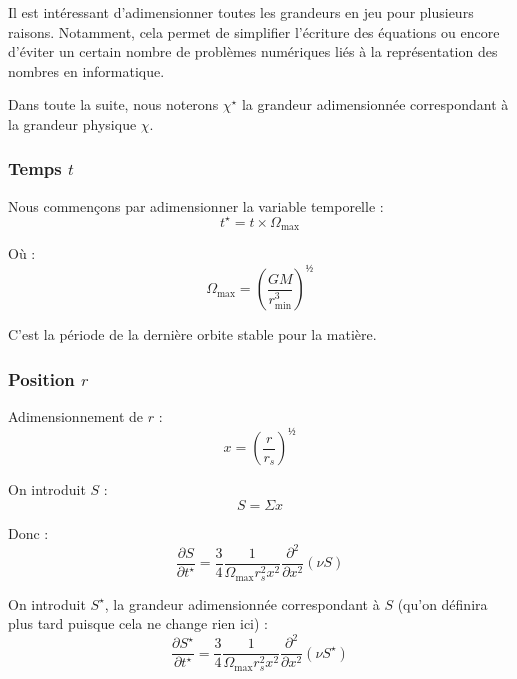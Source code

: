 Il est intéressant d’adimensionner toutes les grandeurs en jeu pour plusieurs
raisons. Notamment, cela permet de simplifier l’écriture des équations ou
encore d’éviter un certain nombre de problèmes numériques liés à la
représentation des nombres en informatique.

Dans toute la suite, nous noterons $\chi^\star$ la grandeur adimensionnée
correspondant à la grandeur physique $\chi$.

\subsubsection{\texorpdfstring{Temps $t$}{Temps t}}

Nous commençons par adimensionner la variable temporelle :
\begin{equation}
    t^\star = t \times \Omega_\mathrm{max}
\end{equation}

Où :
\begin{equation}
    \Omega_\mathrm{max} = \left( \frac{G M}{r^3_\mathrm{min}} \right)^½
\end{equation}

C’est la période de la dernière orbite stable pour la matière.

\subsubsection{\texorpdfstring{Position $r$}{Position r}}

Adimensionnement de $r$ :
\begin{equation}
    x = \left( \frac{r}{r_s} \right)^½
\end{equation}

On introduit $S$ :
\begin{equation}
    S = \Sigma x
\end{equation}

Donc :
\begin{equation}
    \frac{\partial S}{\partial t^\star} = \frac{3}{4} \frac{1}{\Omega_\mathrm{max} r_s^2 x^2} \frac{\partial^2}{\partial x^2} \left(\nu S\right)
\end{equation}

On introduit $S^\star$, la grandeur adimensionnée correspondant à $S$ (qu’on définira plus tard puisque cela ne change rien ici) :
\begin{equation}
    \frac{\partial S^\star}{\partial t^\star} = \frac{3}{4} \frac{1}{\Omega_\mathrm{max} r_s^2 x^2} \frac{\partial^2}{\partial x^2} \left(\nu S^\star\right)
\end{equation}

